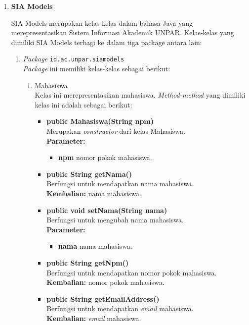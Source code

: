 \documentclass[a4paper,twoside]{article}
\begin{document}
\begin{enumerate}
\begin{enumerate}
\item\textbf{SIA Models}

SIA Models merupakan kelas-kelas dalam bahasa Java yang merepresentasikan Sistem Informasi Akademik UNPAR\cite{siamodels}. Kelas-kelas yang dimiliki SIA Models terbagi ke dalam tiga package antara lain:

\begin{enumerate}
	\item \textit{Package} \texttt{id.ac.unpar.siamodels}\\
	\textit{Package} ini memiliki kelas-kelas sebagai berikut:
	\begin{enumerate}
		\item Mahasiswa\\
		Kelas ini merepresentasikan mahasiswa. \textit{Method-method} yang dimiliki kelas ini adalah sebagai berikut:
		\begin{itemize}
			\item \textbf{public Mahasiswa(String npm)}\\
			Merupakan \textit{constructor} dari kelas Mahasiswa.\\
			\textbf{Parameter:}
			\begin{itemize}
				\item \textbf{npm} nomor pokok mahasiswa.
			\end{itemize}
			
			\item \textbf{public String getNama()}\\
				Berfungsi untuk mendapatkan nama mahasiswa.\\
				\textbf{Kembalian:} nama mahasiswa.

			\item \textbf{public void setNama(String nama)}\\
				Berfungsi untuk mengubah nama mahasiswa.\\
				\textbf{Parameter:}
				\begin{itemize}
					\item \textbf{nama} nama mahasiswa.
				\end{itemize}
		
			\item \textbf{public String getNpm()}\\
				Berfungsi untuk mendapatkan nomor pokok mahasiswa.\\
				\textbf{Kembalian:} nomor pokok mahasiswa.
			
			\item \textbf{public String getEmailAddress()}\\
				Berfungsi untuk mendapatkan \textit{email} mahasiswa.\\
				\textbf{Kembalian:} \textit{email} mahasiswa.
			

\end{itemize}
\end{enumerate}
\end{enumerate}
\end{enumerate}
\end{enumerate}
\end{document}
